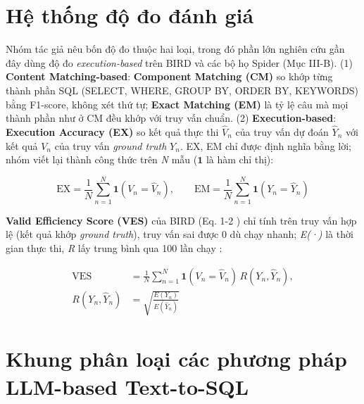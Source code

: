 \section{Hệ thống độ đo đánh giá}

Nhóm tác giả \cite{ref1} nêu bốn độ đo thuộc hai loại, trong đó phần lớn nghiên cứu gần đây dùng độ đo \emph{execution-based} trên BIRD và các bộ họ Spider (Mục III-B). (1) \textbf{Content Matching-based}: \textbf{Component Matching (CM)} so khớp từng thành phần SQL (SELECT, WHERE, GROUP BY, ORDER BY, KEYWORDS) bằng F1-score, không xét thứ tự; \textbf{Exact Matching (EM)} là tỷ lệ câu mà mọi thành phần như ở CM đều khớp với truy vấn chuẩn. (2) \textbf{Execution-based}: \textbf{Execution Accuracy (EX)} so kết quả thực thi \emph{\ensuremath{\hat{V}_n}} của truy vấn dự đoán \emph{\ensuremath{\hat{Y}_n}} với kết quả \emph{\ensuremath{V_n}} của truy vấn \emph{ground truth} \emph{\ensuremath{Y_n}}. EX, EM chỉ được định nghĩa bằng lời; nhóm viết lại thành công thức trên \emph{N} mẫu (\ensuremath{\mathbf{1}} là hàm chỉ thị):

\begin{equation}
\mathrm{EX}=\frac{1}{N}\sum_{n=1}^{N}\mathbf{1}(V_n=\hat{V}_n),\qquad \mathrm{EM}=\frac{1}{N}\sum_{n=1}^{N}\mathbf{1}(Y_n=\hat{Y}_n)
\end{equation}

\textbf{Valid Efficiency Score (VES)} của BIRD \cite{ref3} (Eq. 1-2 \cite{ref1}) chỉ tính trên truy vấn hợp lệ (kết quả khớp \emph{ground truth}), truy vấn sai được 0 dù chạy nhanh; \emph{E(·)} là thời gian thực thi, \emph{R} lấy trung bình qua 100 lần chạy \cite{ref1}:

\begin{equation}
\begin{aligned}\mathrm{VES}&=\frac{1}{N}\sum_{n=1}^{N}\mathbf{1}(V_n=\hat{V}_n)\,R(Y_n,\hat{Y}_n),\\ R(Y_n,\hat{Y}_n)&=\sqrt{\frac{E(Y_n)}{E(\hat{Y}_n)}}\end{aligned}
\end{equation}

\section{Khung phân loại các phương pháp LLM-based Text-to-SQL}


